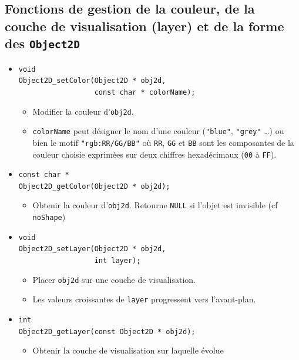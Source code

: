 \documentclass[12pt]{article}
\begin{document}
\subsection{Fonctions de gestion de la couleur,
            de la couche de visualisation (layer) et de
            la forme des {\tt Object2D}}

\begin{itemize}

\item \verb!void! \\
      \verb!Object2D_setColor(Object2D * obj2d,!\\
      \verb!                  const char * colorName);!
      \begin{itemize}
      \item Modifier la couleur d'\verb!obj2d!.
      \item \verb!colorName! peut d\'esigner le nom d'une couleur
            (\verb!"blue"!, \verb!"grey"! \ldots) ou bien le motif
            \verb!"rgb:RR/GG/BB"! o\`u \verb!RR!, \verb!GG! et \verb!BB!
            sont les composantes de la couleur choisie exprim\'ees sur
            deux chiffres hexad\'ecimaux (\verb!00! \`a \verb!FF!).
      \end{itemize}
\item \verb!const char *! \\
      \verb!Object2D_getColor(Object2D * obj2d);!
      \begin{itemize}
      \item Obtenir la couleur d'\verb!obj2d!. Retourne \verb!NULL!
            si l'objet est invisible (cf {\tt noShape})
      \end{itemize}
\item \verb!void! \\
      \verb!Object2D_setLayer(Object2D * obj2d,!\\
      \verb!                  int layer);!
      \begin{itemize}
      \item Placer \verb!obj2d! sur une couche de visualisation.
      \item Les valeurs croissantes de \verb!layer! progressent vers
            l'avant-plan.
      \end{itemize}
\item \verb!int! \\
      \verb!Object2D_getLayer(const Object2D * obj2d);!
      \begin{itemize}
      \item Obtenir la couche de visualisation sur laquelle \'evolue

\end{itemize}
\end{itemize}
\end{document}
